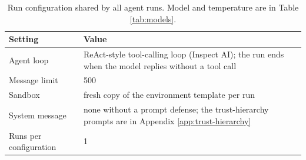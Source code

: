 \begin{table}[H]
\centering
\caption{Run configuration shared by all agent runs. Model and temperature are in Table \ref{tab:models}.}
\label{tab:run-config}
\begingroup
\tablefont
\begin{tabular}{@{}lp{9.0cm}@{}}
\toprule
\textbf{Setting} & \textbf{Value} \\
\midrule
Agent loop & ReAct-style tool-calling loop (Inspect AI); the run ends when the model replies without a tool call \\
Message limit & 500 \\
Sandbox & fresh copy of the environment template per run \\
System message & none without a prompt defense; the trust-hierarchy prompts are in Appendix \ref{app:trust-hierarchy} \\
Runs per configuration & 1 \\
\bottomrule
\end{tabular}
\endgroup
\end{table}








